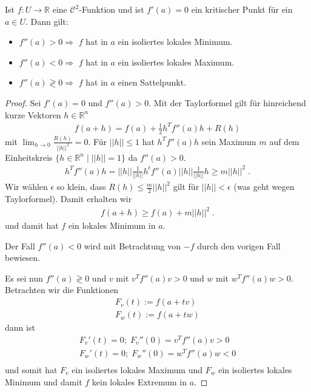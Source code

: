 \begin{Satz}
 Ist $f: U  \to \mathbb{R}$ eine $\mathcal{C}^2$-Funktion und ist $f'(a) = 0$  ein kritischer Punkt für ein $a \in U$. Dann gilt:
\begin{itemize}
\item $f''(a) > 0 \Rightarrow $ $f$ hat in $a$ ein isoliertes lokales Minimum.
\item $f''(a) < 0 \Rightarrow $ $f$ hat in $a$ ein isoliertes lokales Maximum.
\item $f''(a) \gtrless 0 \Rightarrow $ $f$ hat in $a$ einen Sattelpunkt.
\end{itemize} 
\end{Satz}
\begin{proof}
Sei $f'(a) = 0$ und $f''(a) > 0$. Mit der Taylorformel gilt für hinreichend kurze Vektoren $h \in \mathbb{R}^n$
\begin{align*}
f(a + h) = f(a) + \frac{1}{2} h^T f''(a) h + R(h)
\end{align*}
mit $\lim_{h \to 0} \frac{R(h)}{ ||h||^2} = 0$. Für $||h|| \leq 1$ hat $ h^T f''(a) h $ sein Maximum $m$ auf dem Einheitskreis $\{ h \in \mathbb{R}^n \; | \; ||h|| = 1 \}$ da $f''(a) > 0$.
\begin{align*}
 h^T f''(a) h  = ||h|| \frac{1}{||h||} h^t  f''(a)  ||h|| \frac{1}{||h||} h \geq m ||h||^2 \;.
\end{align*}
Wir wählen $\epsilon$ so klein, dass $R(h) \leq \frac{m}{2}  ||h||^2$ gilt für $||h|| < \epsilon$  (was geht wegen Taylorformel).
Damit erhalten wir
\begin{align*}
f(a + h) \geq f(a) +  m ||h||^2 \;.
\end{align*}
und damit hat $f$ ein lokales Minimum in $a$.

Der Fall $f''(a) < 0$ wird mit Betrachtung von $-f$ durch den vorigen Fall bewiesen.

Es sei nun $f''(a) \gtrless 0$ und $v$ mit $v^T f''(a) v > 0$ und $w$ mit $w^T f''(a) w > 0$. Betrachten wir die Funktionen
\begin{align*}
F_v (t) := f(a + tv) \\
F_w(t) := f(a +tw)
\end{align*}
dann ist 
\begin{align*}
F_v' (t) = 0; \; F_v''(0) = v^T f''(a) v > 0 \\
F_w' (t) = 0; \; F_w''(0) = w^T f''(a) w < 0 \\
\end{align*}
und somit hat $F_v$ ein isoliertes lokales Maximum und $F_w$ ein isoliertes lokales Minimum und damit $f$ kein lokales Extremum  in  $a$.
\end{proof}


